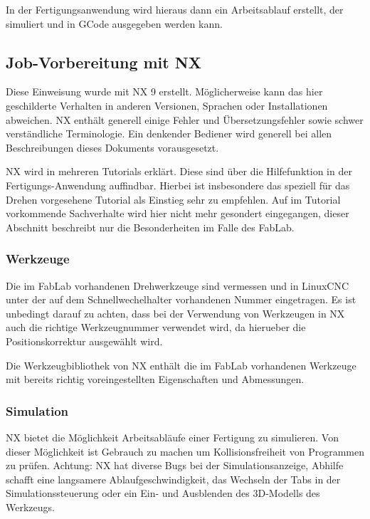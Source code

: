 \documentclass{\basedir/fablab-document}
\begin{document}
In der Fertigungsanwendung wird hieraus dann ein Arbeitsablauf erstellt, der simuliert und in GCode ausgegeben werden kann.

\subsection{Job-Vorbereitung mit NX}
Diese Einweisung wurde mit NX 9 erstellt. Möglicherweise kann das hier geschilderte Verhalten in anderen Versionen, Sprachen oder Installationen abweichen. NX enthält generell einige Fehler und Übersetzungsfehler sowie schwer verständliche Terminologie. Ein denkender Bediener wird generell bei allen Beschreibungen dieses Dokuments vorausgesetzt.

NX wird in mehreren Tutorials erklärt. Diese sind über die Hilfefunktion in der Fertigungs-Anwendung auffindbar. Hierbei ist insbesondere das speziell für das Drehen vorgesehene Tutorial als Einstieg sehr zu empfehlen. Auf im Tutorial vorkommende Sachverhalte wird hier nicht mehr gesondert eingegangen, dieser Abschnitt beschreibt nur die Besonderheiten im Falle des FabLab.

\subsubsection{Werkzeuge}

Die im FabLab vorhandenen Drehwerkzeuge sind vermessen und in LinuxCNC unter der auf dem Schnellwechelhalter vorhandenen Nummer eingetragen. Es ist unbedingt darauf zu achten, dass bei der Verwendung von Werkzeugen in NX auch die richtige Werkzeugnummer verwendet wird, da hierueber die Positionskorrektur ausgewählt wird.

Die Werkzeugbibliothek von NX enthält die im FabLab vorhandenen Werkzeuge mit bereits richtig voreingestellten Eigenschaften und Abmessungen. 

\subsubsection{Simulation}

NX bietet die Möglichkeit Arbeitsabläufe einer Fertigung zu simulieren. Von dieser Möglichkeit ist Gebrauch zu machen um Kollisionsfreiheit von Programmen zu prüfen. Achtung: NX hat diverse Bugs bei der Simulationsanzeige, Abhilfe schafft eine langsamere Ablaufgeschwindigkeit, das Wechseln der Tabs in der Simulationssteuerung oder ein Ein- und Ausblenden des 3D-Modells des Werkzeugs.
\end{document}
